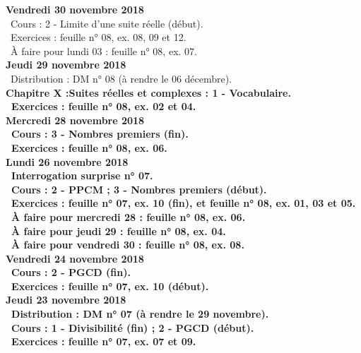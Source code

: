 \documentclass[12pt,a4paper]{article}
\begin{document}
\noindent\textbf{Vendredi 30 novembre 2018}\\
\bu\ Cours : 2 - Limite d'une suite réelle (début).\\
\bu\ Exercices : feuille n° 08, ex. 08, 09 et 12.\\
\bu\ À faire pour lundi 03 : feuille n° 08, ex. 07.\vspace{.4cm}\\
 
\noindent\textbf{Jeudi 29 novembre 2018}\\
\bu\ Distribution : DM n° 08 (à rendre le 06 décembre).\\
\bf Chapitre X :\rm Suites réelles et complexes : 1 - Vocabulaire.\\
\bu\ Exercices : feuille n° 08, ex. 02 et 04.\vspace{.4cm}\\
 
\noindent\textbf{\bf Mercredi 28 novembre 2018}\\
\bu\ Cours : 3 - Nombres premiers (fin).\\
\bu\ Exercices : feuille n° 08, ex. 06.\vspace{.4cm}\\
 
\noindent\textbf{Lundi 26 novembre 2018}\\
\bu\ Interrogation surprise n° 07.\\
\bu\ Cours : 2 - PPCM ; 3 - Nombres premiers (début).\\
\bu\ Exercices : feuille n° 07, ex. 10 (fin), et feuille n° 08, ex. 01, 03 et 05.\\
\bu\ À faire pour mercredi 28 : feuille n° 08, ex. 06.\\
\bu\ À faire pour jeudi 29 : feuille n° 08, ex. 04.\\
\bu\ À faire pour vendredi 30 : feuille n° 08, ex. 08.\vspace{.4cm}\\
 
\noindent\textbf{Vendredi 24 novembre 2018}\\
\bu\ Cours : 2 - PGCD (fin).\\
\bu\ Exercices : feuille n° 07, ex. 10 (début).\vspace{.4cm}\\
 
\noindent\textbf{Jeudi 23 novembre 2018}\\
\bu\ Distribution : DM n° 07 (à rendre le 29 novembre).\\
\bu\ Cours : 1 - Divisibilité (fin) ; 2 - PGCD (début).\\
\bu\ Exercices : feuille n° 07, ex. 07 et 09.\vspace{.4cm}\\
 
\end{document}
